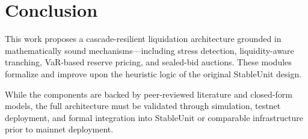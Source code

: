 \documentclass[11pt]{article}
\begin{document}
\section{Conclusion}
This work proposes a cascade-resilient liquidation architecture grounded in mathematically sound mechanisms—including stress detection, liquidity-aware tranching, VaR-based reserve pricing, and sealed-bid auctions. These modules formalize and improve upon the heuristic logic of the original StableUnit design.

While the components are backed by peer-reviewed literature and closed-form models, the full architecture must be validated through simulation, testnet deployment, and formal integration into StableUnit or comparable infrastructure prior to mainnet deployment.



\printbibliography
\end{document}
